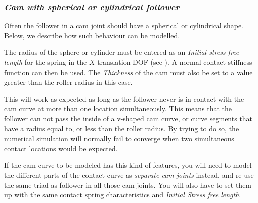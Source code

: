
\subsubsection{\sl\textbf{Cam with spherical or cylindrical follower}}

Often the follower in a cam joint should have a spherical or cylindrical
shape. Below, we describe how such behaviour can be modelled.

The radius of the sphere or cylinder must be entered as an
{\sl Initial stress free length} for the spring in the $X$-translation DOF
(see ).
A normal contact stiffness function can then be used.
The {\sl Thickness} of the cam must also be set to a value greater than
the roller radius in this case.

This will work as expected as long as the follower never is in contact
with the cam curve at more than one location simultaneously.
This means that the follower can not pass the inside of a v-shaped cam curve,
or curve segments that have a radius equal to, or less than the roller radius.
By trying to do so, the numerical simulation will normally fail to converge
when two simultaneous contact locations would be expected.

If the cam curve to be modeled has this kind of features, you will need to model
the different parts of the contact curve as {\sl separate cam joints} instead,
and re-use the same triad as follower in all those cam joints.
You will also have to set them up with the same contact spring
characteristics and {\sl Initial Stress free length}.


